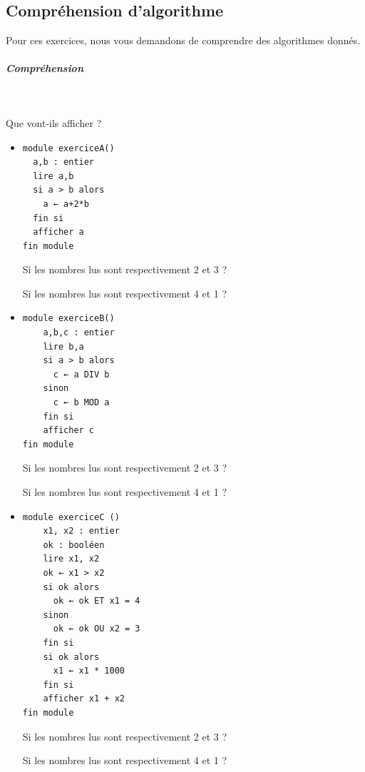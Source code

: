 \documentclass[11pt,a4paper]{article}
\begin{document}
            \par
        \subsection{Compr\'ehension d'algorithme}
          Pour ces exercices, nous vous demandons de comprendre des algorithmes donn\'es. 
          
			
		\subparagraph{Compr\'ehension} 
		
                \textcolor{white}{.} \par
            
							  Que vont-ils afficher ?
              
					\begin{itemize}
				
			\item \begin{verbatim}
module exerciceA()
  a,b : entier
  lire a,b
  si a > b alors
    a ← a+2*b
  fin si
  afficher a
fin module
				\end{verbatim}Si les nombres lus sont respectivement 2 et 3 ? 
            \par
         \textcolor{gray}{\underline{\hspace*{1em}}} Si les nombres lus sont respectivement 4 et 1 ? 
            \par
         \textcolor{gray}{\underline{\hspace*{1em}}} 
			\item \begin{verbatim}
module exerciceB()
    a,b,c : entier
    lire b,a
    si a > b alors
      c ← a DIV b
    sinon
      c ← b MOD a
    fin si
    afficher c
fin module
				\end{verbatim}Si les nombres lus sont respectivement 2 et 3 ? 
            \par
         \textcolor{gray}{\underline{\hspace*{1em}}} Si les nombres lus sont respectivement 4 et 1 ? 
            \par
         \textcolor{gray}{\underline{\hspace*{1em}}} 
			\item \begin{verbatim}
module exerciceC ()
    x1, x2 : entier
    ok : booléen
    lire x1, x2
    ok ← x1 > x2
    si ok alors
      ok ← ok ET x1 = 4
    sinon
      ok ← ok OU x2 = 3
    fin si
    si ok alors
      x1 ← x1 * 1000
    fin si
    afficher x1 + x2
fin module
				\end{verbatim}Si les nombres lus sont respectivement 2 et 3 ? 
            \par
         \textcolor{gray}{\underline{\hspace*{3em}}} Si les nombres lus sont respectivement 4 et 1 ? 
            \par
         \textcolor{gray}{\underline{\hspace*{3em}}} 
					\end{itemize}
				
\end{document}
